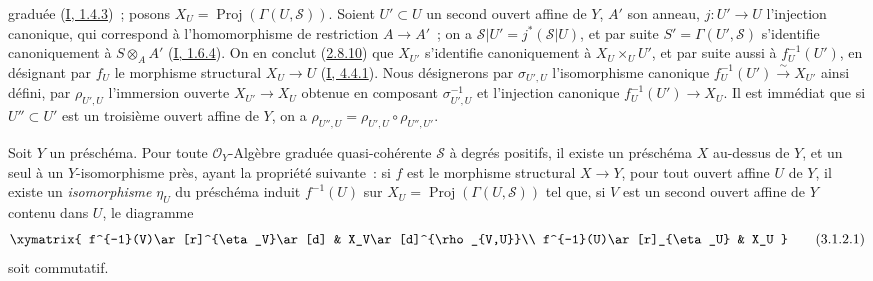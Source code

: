\begin{env}[3.1.1]
graduée (\hyperref[I.1.4.3-fr]{I, 1.4.3})~; posons
$X_U=\operatorname{Proj}(\Gamma(U,\mathcal{S}))$. Soient $U'\subset U$ un
second ouvert affine de $Y$, $A'$ son anneau, $j:U'\to U$ l'injection
canonique, qui correspond à l'homomorphisme de restriction $A\to A'$~; on a
$\mathcal{S}|U'=j^*(\mathcal{S}|U)$, et par suite
$S'=\Gamma(U',\mathcal{S})$ s'identifie canoniquement à $S\otimes_A A'$
(\hyperref[I.1.6.4-fr]{I, 1.6.4}). On en conclut
(\hyperref[II.2.8.10-fr]{2.8.10}) que $X_{U'}$ s'identifie canoniquement à
$X_U\times_U U'$, et par suite aussi à $f_U^{-1}(U')$, en désignant par
$f_U$ le morphisme structural $X_U\to U$
(\hyperref[I.4.4.1-fr]{I, 4.4.1}). Nous désignerons par $\sigma_{U',U}$
l'isomorphisme canonique $f_U^{-1}(U')\xrightarrow{\sim}X_{U'}$ ainsi défini,
par $\rho_{U',U}$ l'immersion ouverte $X_{U'}\to X_U$ obtenue en composant
$\sigma_{U',U}^{-1}$ et l'injection canonique $f_U^{-1}(U')\to X_U$. Il est
immédiat que si $U''\subset U'$ est un troisième ouvert affine de $Y$, on a
$\rho_{U'',U}=\rho_{U',U}\circ\rho_{U'',U'}$.
\end{env}

\begin{proposition}[3.1.2]
\label{II.3.1.2-fr}
Soit $Y$ un préschéma. Pour toute $\mathcal{O}_Y$-Algèbre graduée
quasi-cohérente $\mathcal{S}$ à degrés positifs, il existe un préschéma $X$
au-dessus de $Y$, et un seul à un $Y$-isomorphisme près, ayant la propriété
suivante~: si $f$ est le morphisme structural $X\to Y$, pour tout ouvert
affine $U$ de $Y$, il existe un \emph{isomorphisme} $\eta_U$ du préschéma
induit $f^{-1}(U)$ sur $X_U=\operatorname{Proj}(\Gamma(U,\mathcal{S}))$ tel
que, si $V$ est un second ouvert affine de $Y$ contenu dans $U$, le diagramme
\[
\label{II.3.1.2.1-fr}
  \xymatrix{
    f^{-1}(V)\ar[r]^{\eta_V}\ar[d]
    & X_V\ar[d]^{\rho_{V,U}}\\
    f^{-1}(U)\ar[r]_{\eta_U}
    & X_U
  }
\tag{3.1.2.1}
\]
soit commutatif.
\end{proposition}

